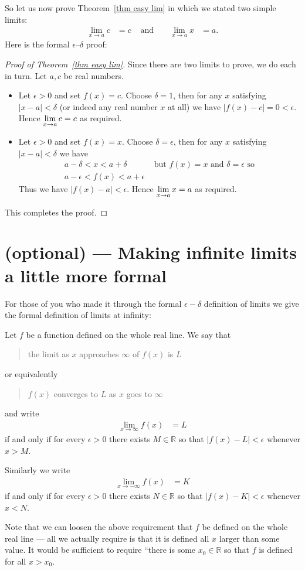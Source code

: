So let us now prove Theorem~\ref{thm easy lim} in which we stated two simple
limits:
\begin{align*}
  \lim_{x \to a} c &= c & \text{ and } && \lim_{x \to a} x &= a.
\end{align*}
Here is the formal $\epsilon$--$\delta$ proof:
\begin{proof}[Proof of Theorem~\ref{thm easy lim}]
 Since there are two limits to prove, we do each in turn. Let $a,c$ be real
numbers.
\begin{itemize}
 \item Let $\epsilon>0$ and set $f(x)=c$. Choose $\delta=1$, then for any
$x$ satisfying $|x-a|<\delta$ (or indeed any real number $x$ at all) we have
$|f(x)-c| = 0 <\epsilon$. Hence $\displaystyle \lim_{x \to a} c = c$ as required.

 \item Let $\epsilon>0$ and set $f(x)=x$. Choose $\delta=\epsilon$, then for
any $x$ satisfying $|x-a|<\delta$ we have
\begin{align*}
  a-\delta < x < a+\delta & \text{ but $f(x) = x$ and $\delta=\epsilon$ so} \\
  a-\epsilon < f(x) < a+\epsilon
\end{align*}
Thus we have $|f(x)-a|<\epsilon$. Hence $\displaystyle \lim_{x \to a} x = a$ as required.
\end{itemize}
This completes the proof.
\end{proof}


\section{(optional) --- Making infinite limits a little more formal}
\label{sec lim inf formal}
For those of you who made it through the formal $\epsilon-\delta$ definition of
limits we give the formal definition of limits at infinity:
\begin{defn}
 Let $f$ be a function defined on the whole real line. We say that
\begin{quote}
  the limit as $x$ approaches $\infty$ of $f(x)$ is $L$
\end{quote}
or equivalently
\begin{quote}
 $f(x)$ converges to $L$ as $x$ goes to $\infty$
\end{quote}
and write
\begin{align*}
  \lim_{x \to \infty} f(x) &= L
\end{align*}
if and only if for every $\epsilon>0$ there exists $M \in \mathbb{R}$ so that
$|f(x)-L| < \epsilon$ whenever $x>M$.

Similarly we write
\begin{align*}
  \lim_{x \to -\infty} f(x) &= K
\end{align*}
if and only if for every $\epsilon>0$ there exists $N \in \mathbb{R}$ so that
$|f(x)-K| < \epsilon$ whenever $x<N$.

\end{defn}
Note that we can loosen the above requirement that $f$ be defined on the whole real line
--- all we actually require is that it is defined all $x$ larger than some value. It
would be sufficient to require ``there is some $x_0 \in \mathbb{R}$ so that $f$ is
defined for all $x>x_0$.

